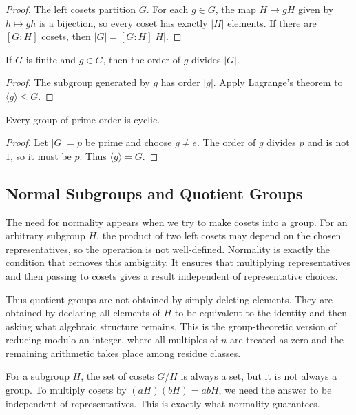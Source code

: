 \begin{proof}
The left cosets partition $G$. For each $g\in G$, the map $H\to gH$ given by $h\mapsto gh$ is a bijection, so every coset has exactly $|H|$ elements. If there are $[G:H]$ cosets, then $|G|=[G:H]|H|$.
\end{proof}

\begin{corollary}
If $G$ is finite and $g\in G$, then the order of $g$ divides $|G|$.
\end{corollary}

\begin{proof}
The subgroup generated by $g$ has order $|g|$. Apply Lagrange's theorem to $\langle g\rangle\leq G$.
\end{proof}

\begin{corollary}
Every group of prime order is cyclic.
\end{corollary}

\begin{proof}
Let $|G|=p$ be prime and choose $g\neq e$. The order of $g$ divides $p$ and is not $1$, so it must be $p$. Thus $\langle g\rangle=G$.
\end{proof}

\subsection{Normal Subgroups and Quotient Groups}


The need for normality appears when we try to make cosets into a group. For an arbitrary subgroup $H$, the product of two left cosets may depend on the chosen representatives, so the operation is not well-defined. Normality is exactly the condition that removes this ambiguity. It ensures that multiplying representatives and then passing to cosets gives a result independent of representative choices.

Thus quotient groups are not obtained by simply deleting elements. They are obtained by declaring all elements of $H$ to be equivalent to the identity and then asking what algebraic structure remains. This is the group-theoretic version of reducing modulo an integer, where all multiples of $n$ are treated as zero and the remaining arithmetic takes place among residue classes.

For a subgroup $H$, the set of cosets $G/H$ is always a set, but it is not always a group. To multiply cosets by $(aH)(bH)=abH$, we need the answer to be independent of representatives. This is exactly what normality guarantees.

